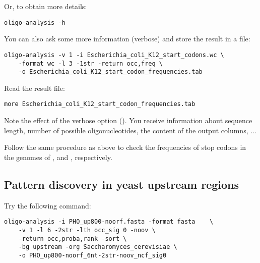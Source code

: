 Or, to obtain more details:
{\color{Blue} \begin{footnotesize} 
\begin{verbatim}
oligo-analysis -h
\end{verbatim} \end{footnotesize}
}

You can also ask some more information (verbose) and store the result
in a file:

{\color{Blue} \begin{footnotesize} 
\begin{verbatim}
oligo-analysis -v 1 -i Escherichia_coli_K12_start_codons.wc \
    -format wc -l 3 -1str -return occ,freq \
    -o Escherichia_coli_K12_start_codon_frequencies.tab
\end{verbatim} \end{footnotesize}
}

Read the result file:

{\color{Blue} \begin{footnotesize} 
\begin{verbatim}
more Escherichia_coli_K12_start_codon_frequencies.tab
\end{verbatim} \end{footnotesize}
}


Note the effect of the verbose option (). You receive
information about sequence length, number of possible
oligonucleotides, the content of the output columns, ...


\begin{exercise}
  Follow the same procedure as above to check the frequencies of stop
  codons in the genomes of , and
  \org{Saccharomyces cerevisia}, respectively.
\end{exercise}

\subsection{Pattern discovery in yeast upstream regions}

Try the following command:

{\color{Blue} \begin{footnotesize} 
\begin{verbatim} 
oligo-analysis -i PHO_up800-noorf.fasta -format fasta    \
    -v 1 -l 6 -2str -lth occ_sig 0 -noov \
    -return occ,proba,rank -sort \
    -bg upstream -org Saccharomyces_cerevisiae \
    -o PHO_up800-noorf_6nt-2str-noov_ncf_sig0 
\end{verbatim} \end{footnotesize}
}


